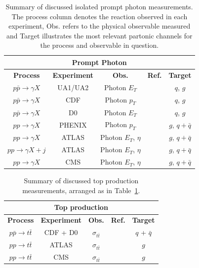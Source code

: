 \documentclass[12pt,oneside,openright]{report}
\begin{document}
\begin{spacing}{1.5}
\begin{table}[h]
\begin{center}
\begin{tabular}{|c|c|c|c|c|}
\hline
\multicolumn{5}{|c|}{\textbf{Prompt Photon}}\\
\hline
\textbf{Process} & \textbf{Experiment} & \textbf{Obs.} &\textbf{Ref.} &  \textbf{Target} \\
\hline\hline
$p\bar{p} \to \gamma X$ & UA1/UA2 & Photon $E_T$ &\cite{Albajar:1988im,Alitti:1992hn,Ansari:1988te} &$q$, $g$ \\
$p\bar{p} \to \gamma X$ & CDF & Photon $p_T$ &\cite{Aaltonen:2009ty,Abazov:2005wc,Abe:1994rra,Acosta:2002ya,Acosta:2004bg}& $q$, $g$\\
$p\bar{p} \to \gamma X$ & D0 & Photon $E_T$ &\cite{Abachi:1996qz,Abazov:2001af,Abbott:1999kd}& $q$, $g$\\
\hline
$pp \to \gamma X$ & PHENIX & Photon $p_T$ &\cite{Adler:2006yt} & $g$, $q+\bar{q}$ \\
\hline\hline
$pp \to \gamma X$ & ATLAS & Photon $E_T$, $\eta$ &\cite{Aad:2011tw} & $g$, $q+\bar{q}$  \\
$pp \to \gamma X + j$ & ATLAS & Photon $E_T$, $\eta$ &\cite{Aad:2011tw} & $g$, $q + \bar{q}$ \\
\hline
$pp \to \gamma X$ & CMS & Photon $E_T$, $\eta$ &\cite{Chatrchyan:2011ue} & $g$, $q + \bar{q}$ \\
\hline
\end{tabular}
\end{center}
\caption{Summary of discussed isolated prompt photon measurements. The process column denotes the reaction observed in each experiment, Obs. refers to the physical observable measured and Target illustrates the most relevant partonic channels for the process and observable in question.}
\label{tab:pp_summary}
\end{table}%

\begin{table}[h]
\begin{center}
\begin{tabular}{|c|c|c|c|c|}
\hline
\multicolumn{5}{|c|}{\textbf{Top production}}\\
\hline
\textbf{Process} & \textbf{Experiment} & \textbf{Obs.} &\textbf{Ref.} &  \textbf{Target} \\
\hline\hline
$p\bar{p} \to t\bar{t}$ & CDF + D0 & $\sigma_{t\bar{t}}$&\cite{Aaltonen:2012ttbar} & $q$ + $\bar{q}$ \\
\hline\hline
$pp \to t\bar{t}$ & ATLAS & $\sigma_{t\bar{t}}$&\cite{ATLAS:2012jyc,ATLAS:2012fja} & $g$ \\
$pp \to t\bar{t}$ & CMS & $\sigma_{t\bar{t}}$&\cite{Chatrchyan:2012bra,CMS:2012iba} & $g$ \\
\hline
\end{tabular}
\end{center}
\caption{Summary of discussed top production measurements, arranged as in Table~\ref{tab:pp_summary}.}
\label{tab:ttbar_summary}
\end{table}%




\end{spacing}
\end{document}
